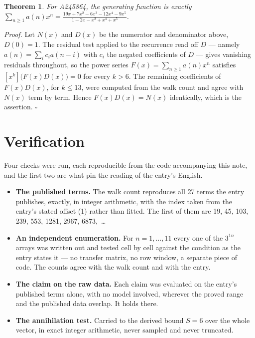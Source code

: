 \documentclass[11pt]{article}
\newtheorem{theorem}{Theorem}
\theoremstyle{definition}
\begin{document}
\begin{theorem} For A245864, the generating function is exactly $\sum_{n\ge 1} a(n)x^n = \frac{19x + 7x^{2} - 6x^{3} - 12x^{4} - 9x^{5}}{1 - 2x - x^{2} + x^{4} + x^{5}}$.\end{theorem}

{\itshape Proof.} Let $N(x)$ and $D(x)$ be the numerator and denominator above, $D(0)=1$. The residual test applied to the recurrence read off $D$ --- namely $a(n) = \sum_i c_i a(n-i)$ with $c_i$ the negated coefficients of $D$ --- gives vanishing residuals throughout, so the power series $F(x)=\sum_{n\ge 1}a(n)x^n$ satisfies $[x^k]\bigl(F(x)D(x)\bigr) = 0$ for every $k > 6$. The remaining coefficients of $F(x)D(x)$, for $k \le 13$, were computed from the walk count and agree with $N(x)$ term by term. Hence $F(x)D(x) = N(x)$ identically, which is the assertion. $\square$

\section{Verification}

Four checks were run, each reproducible from the code accompanying this note, and the first two are what pin the reading of the entry's English.

\begin{itemize}

\item {\bfseries The published terms.} The walk count reproduces all 27 terms the entry publishes, exactly, in integer arithmetic, with the index taken from the entry's stated offset (1) rather than fitted. The first of them are 19, 45, 103, 239, 553, 1281, 2967, 6873,~\dots

\item {\bfseries An independent enumeration.} For $n = 1,\dots,11$ every one of the $3^{1n}$ arrays was written out and tested cell by cell against the condition as the entry states it --- no transfer matrix, no row window, a separate piece of code. The counts agree with the walk count and with the entry.

\item {\bfseries The claim on the raw data.} Each claim was evaluated on the entry's published terms alone, with no model involved, wherever the proved range and the published data overlap. It holds there.

\item {\bfseries The annihilation test.} Carried to the derived bound $S = 6$ over the whole vector, in exact integer arithmetic, never sampled and never truncated.

\end{itemize}
\end{document}
